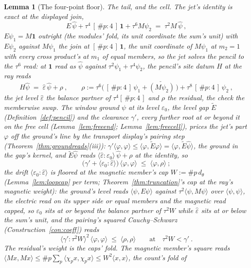\documentclass[11pt]{article}
\newtheorem{lemma}{Lemma}
\theoremstyle{definition}
\begin{document}
\begin{lemma}[The four-point floor]
\emph{The tail, and the cell.} The jet's identity is exact at the
displayed join,
\[
E\,\hat\psi+\tau^4\,[\,\#p:4\,]\,\mathbf1+\tau^6M\psi_2
\;=\;\tau^2M\,\hat\psi\ ,
\]
$E\psi_1=M\mathbf1$ outright (the modules' fold, its unit
coordinate the sum's unit) with $E\psi_2$ against $M\psi_1$ the
join at $[\,\#p:4\,]\,\mathbf1$, the unit coordinate of $M\psi_1$
at $m_2=1$ with every cross product's at $m_1$ of equal members,
so the jet solves the pencil to the $\tau^6$ read: at $\mathbf1$
read as $\hat\psi$ against $\tau^2\psi_1+\tau^4\psi_2$, the pencil's
site datum $H$ at the ray reads
\[
H\hat\psi\;=\;\hat\varepsilon\,\hat\psi+\rho\ ,\qquad
\rho:=\tau^6\big(\,[\,\#p:4\,]\,\psi_1+\check{(M\psi_2)}\,\big)
+\tau^8\,[\,\#p:4\,]\,\psi_2\ ,
\]
the \emph{jet level} $\hat\varepsilon$ the balance partner of
$\tau^4[\,\#p:4\,]$ and $\rho$ the \emph{residual}, the check the
memberwise swap. The window ground $\psi$ at its level
$\varepsilon_0$, the level gap $\tilde E$
(Definition~\ref{def:pencil}) and the \emph{clearance} $\gamma'$,
every further root at or beyond it on the free cell
(Lemma~\ref{lem:freeend}; Lemma~\ref{lem:freecell}), prices the
jet's part $\varphi$ off the ground's line by the transport
display's pairing step (Theorem~\ref{thm:groundreads}(iii)):
$\gamma'\langle\varphi,\varphi\rangle
\le\langle\varphi,\tilde E\varphi\rangle
=\langle\varphi,\tilde E\hat\psi\rangle$, the ground in the gap's
kernel, and $\tilde E\hat\psi$ reads
$\langle\hat\varepsilon\!:\!\varepsilon_0\rangle\,\hat\psi+\rho$ at
the identity, so
\[
\big(\gamma'+\langle\varepsilon_0\!:\!\hat\varepsilon\rangle\big)
\,\langle\varphi,\varphi\rangle\;\le\;\langle\varphi,\rho\rangle\ ;
\]
the \emph{drift} $\langle\varepsilon_0\!:\!\hat\varepsilon\rangle$
is floored at the magnetic member's cap $W:=\#p\,d_\theta$
(Lemma~\ref{lem:loopcap} per term; Theorem~\ref{thm:truncation}'s
cap at the ray's magnetic weight): the ground's level reads
$\langle\psi,E\psi\rangle$ against $\tau^2\langle\psi,M\psi\rangle$
over $\langle\psi,\psi\rangle$, the electric read on its upper side
or equal members and the magnetic read capped, so $\varepsilon_0$
sits at or beyond the balance partner of $\tau^2W$ while
$\hat\varepsilon$ sits at or below the sum's unit, and the
pairing's squared Cauchy--Schwarz (Construction~\ref{con:coeff})
reads
\[
\langle\gamma'\!:\!\tau^2W\rangle^2\,\langle\varphi,\varphi\rangle
\;\le\;\langle\rho,\rho\rangle
\qquad\text{at}\quad\tau^2W<\gamma'\ .
\]
The residual's weight is the caps' fold. The magnetic member's
square reads $\langle Mx,Mx\rangle\le\#p\sum_p\langle\chi_px,
\chi_px\rangle\le W^2\langle x,x\rangle$, the count's fold of

\end{lemma}
\end{document}
